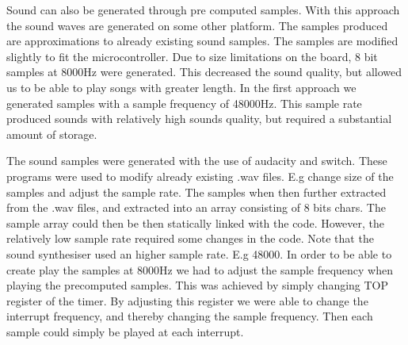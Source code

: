 
Sound can also be generated through pre computed samples. With this approach the sound waves are generated on some other platform. The samples produced are approximations to already existing sound samples. The samples are modified slightly to fit the microcontroller. Due to size limitations on the board, 8 bit samples at 8000Hz were generated. This decreased the sound quality, but allowed us to be able to play songs with greater length. In the first approach we generated samples with a sample frequency of 48000Hz. This sample rate produced sounds with relatively high sounds quality, but required a substantial amount of storage.

The sound samples were generated with the use of audacity and switch. These programs were used to modify already existing .wav files. E.g change size of the samples and adjust the sample rate. The samples when then further extracted from the .wav files, and extracted into an array consisting of 8 bits chars. The sample array could then be then statically linked with the code. However, the relatively low sample rate required some changes in the code. Note that the sound synthesiser used an higher sample rate. E.g 48000. In order to be able to create play the samples at 8000Hz we had to adjust the sample frequency when playing the precomputed samples. This was achieved by simply changing TOP register of the timer. By adjusting this register we were able to change the interrupt frequency, and thereby changing the sample frequency. Then each sample could simply be played at each interrupt.  



  











